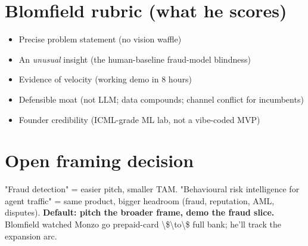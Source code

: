 \documentclass[11pt]{article}
\begin{document}
\section{Blomfield rubric (what he scores)}
\begin{itemize}
  \item Precise problem statement (no vision waffle)
  \item An \emph{unusual} insight (the human-baseline fraud-model blindness)
  \item Evidence of velocity (working demo in 8 hours)
  \item Defensible moat (not LLM; data compounds; channel conflict for incumbents)
  \item Founder credibility (ICML-grade ML lab, not a vibe-coded MVP)
\end{itemize}
\section{Open framing decision}
"Fraud detection" = easier pitch, smaller TAM. "Behavioural risk intelligence for agent traffic" = same product, bigger headroom (fraud, reputation, AML, disputes). \textbf{Default: pitch the broader frame, demo the fraud slice.} Blomfield watched Monzo go prepaid-card \textbackslash{}\$\textbackslash{}to\textbackslash{}\$ full bank; he'll track the expansion arc.
\end{document}
